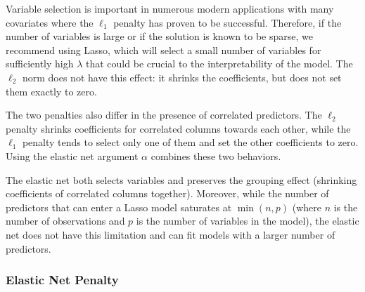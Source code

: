 
Variable selection is important in numerous modern applications with many covariates where the $\ell_1$ penalty has proven to be successful. Therefore, if the number of variables is large or if the solution is known to be sparse, we recommend using Lasso, which will select a small number of variables for sufficiently high $\lambda$ that could be crucial to the interpretability of the model. The $\ell_2$ norm does not have this effect:  it shrinks the coefficients, but does not set them exactly to zero.  %

The two penalties also differ in the presence of correlated
predictors. The $\ell_2$ penalty shrinks coefficients for correlated columns towards each other, while the $\ell_1$ penalty
tends to select only one of them and set the other coefficients to zero. Using the elastic net argument $\alpha$ combines these two behaviors. 

The elastic net both selects variables and preserves the grouping effect (shrinking coefficients of correlated columns together). Moreover, while the number of predictors that can enter a Lasso model saturates at $\min(n,p)$ (where $n$ is the number of observations and $p$ is the number of variables in the model), the elastic net does not have this limitation and can fit models with a larger number of predictors. %

\subsubsection{Elastic Net Penalty}

